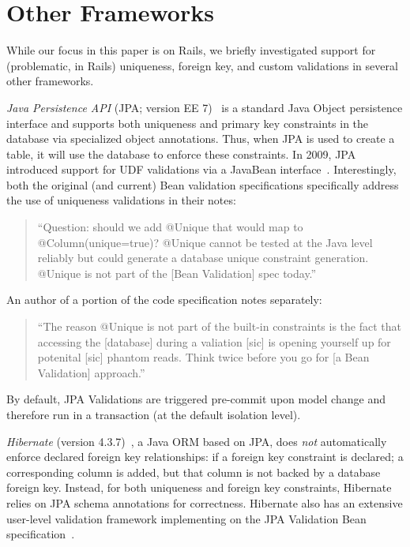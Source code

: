 
\section{Other Frameworks}
\label{sec:other-orms}

While our focus in this paper is on Rails, we briefly investigated
support for (problematic, in Rails) uniqueness, foreign key, and
custom validations in several other frameworks.

\newcommand{\orm}[1]{{\vspace{.45em}\noindent\textit{#1}}}

\orm{Java Persistence API} (JPA; version EE 7)~\cite{code-jpa} is a
standard Java Object persistence interface and supports both
uniqueness and primary key constraints in the database via specialized
object annotations. Thus, when JPA is used to create a table, it will
use the database to enforce these constraints. In 2009, JPA introduced
support for UDF validations via a JavaBean
interface~\cite{code-bean-validation}. Interestingly, both the
original (and current) Bean validation specifications specifically
address the use of uniqueness validations in their notes:
\begin{quote}
``Question: should we add @Unique that would map to @Column(unique=true)?
@Unique cannot be tested at the Java level reliably but could generate
a database unique constraint generation. @Unique is not part
of the [Bean Validation] spec today.''~\cite{jsr-bean}
\end{quote}
An author of a portion of the code specification notes separately:
\begin{quote}
  ``The reason @Unique is not part of the built-in constraints is the
  fact that accessing the [database] during a valiation [sic] is
  opening yourself up for potenital [sic] phantom reads. Think twice
  before you go for [a Bean Validation] approach.''~\cite{unique-bean}
\end{quote}
By default, JPA Validations are triggered pre-commit upon model change
and therefore run in a transaction (at the default isolation level).

\orm{Hibernate} (version 4.3.7)~\cite{code-hibernate}, a Java ORM
based on JPA, does \textit{not} automatically enforce declared foreign
key relationships: if a foreign key constraint is declared; a
corresponding column is added, but that column is not backed by a
database foreign key. Instead, for both uniqueness and foreign key
constraints, Hibernate relies on JPA schema annotations for
correctness. Hibernate also has an extensive user-level validation
framework implementing on the JPA Validation Bean
specification~\cite{code-hibernate-validator}.


